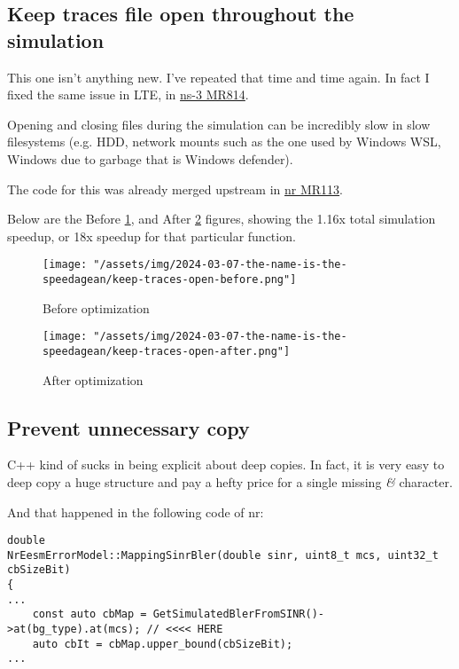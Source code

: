 \documentclass{article}
\begin{document}
\subsection{Keep traces file open throughout the simulation}

This one isn't anything new. I've repeated that time and time again.
In fact I fixed the same issue in LTE, in
\href{https://gitlab.com/nsnam/ns-3-dev/-/merge_requests/814}{ns-3 MR814}.

Opening and closing files during the simulation can be incredibly slow
in slow filesystems (e.g. HDD, network mounts such as the one used by
Windows WSL, Windows due to garbage that is Windows defender).

The code for this was already merged upstream in
\href{https://gitlab.com/cttc-lena/nr/-/merge_requests/113}{nr MR113}.

Below are the Before \ref{fig:keep-traces-open-before},
and After \ref{fig:keep-traces-open-after} figures,
showing the 1.16x total simulation speedup,
or 18x speedup for that particular function.

\begin{figure}
    \texttt{[image: "/assets/img/2024-03-07-the-name-is-the-speedagean/keep-traces-open-before.png"]}
    \caption{Before optimization}
    \label{fig:keep-traces-open-before}
\end{figure}

\begin{figure}
    \texttt{[image: "/assets/img/2024-03-07-the-name-is-the-speedagean/keep-traces-open-after.png"]}
    \caption{After optimization}
    \label{fig:keep-traces-open-after}
\end{figure}

\subsection{Prevent unnecessary copy}

C++ kind of sucks in being explicit about deep copies.
In fact, it is very easy to deep copy a huge structure
and pay a hefty price for a single missing \emph{&} character.

And that happened in the following code of nr:

\begin{lstlisting}
double
NrEesmErrorModel::MappingSinrBler(double sinr, uint8_t mcs, uint32_t cbSizeBit)
{
...
    const auto cbMap = GetSimulatedBlerFromSINR()->at(bg_type).at(mcs); // <<<< HERE
    auto cbIt = cbMap.upper_bound(cbSizeBit);
...
\end{lstlisting}
\end{document}
